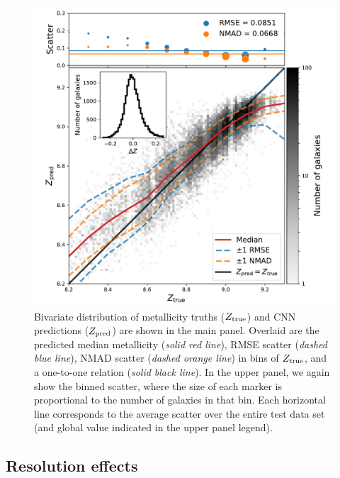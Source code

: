 \documentclass[fleqn,usenatbib]{mnras}
\begin{document}
\begin{figure}
	\includegraphics[width=\columnwidth]{02-prediction_summary.pdf}
	\caption{\label{fig:predicting-metallicity}
		Bivariate distribution of metallicity truths ($Z_{\rm true}$) and CNN predictions ($Z_{\rm pred}$) are shown in the main panel.
		Overlaid are the predicted median metallicity (\textit{solid red line}), RMSE scatter (\textit{dashed blue line}), NMAD scatter (\textit{dashed orange line}) in bins of $Z_{\rm true}$, and a one-to-one relation (\textit{solid black line}).
		In the upper panel, we again show the binned scatter, where the size of each marker is proportional to the number of galaxies in that bin.
		Each horizontal line corresponds to the average scatter over the entire test data set (and global value indicated in the upper panel legend).
		}
\end{figure}




\subsection{Resolution effects} \label{sec:resolution}

\end{document}
